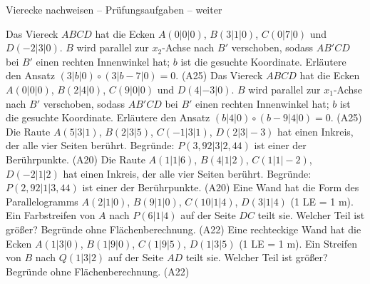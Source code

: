 \begin{aufgabe}{Vierecke nachweisen – Prüfungsaufgaben – weiter}
\begin{teile}
\teil Das Viereck $ABCD$ hat die Ecken $A(0 | 0 | 0)$, $B(3 | 1 | 0)$, $C(0 | 7 | 0)$ und $D(-2 | 3 | 0)$. $B$ wird parallel zur $x_2$-Achse nach $B'$ verschoben, sodass $AB'CD$ bei $B'$ einen rechten Innenwinkel hat; $b$ ist die gesuchte Koordinate. Erläutere den Ansatz $(3 | b | 0) \circ (3 | b - 7 | 0) = 0$. \hfill (A25)
\teil Das Viereck $ABCD$ hat die Ecken $A(0 | 0 | 0)$, $B(2 | 4 | 0)$, $C(9 | 0 | 0)$ und $D(4 | -3 | 0)$. $B$ wird parallel zur $x_1$-Achse nach $B'$ verschoben, sodass $AB'CD$ bei $B'$ einen rechten Innenwinkel hat; $b$ ist die gesuchte Koordinate. Erläutere den Ansatz $(b | 4 | 0) \circ (b - 9 | 4 | 0) = 0$. \hfill (A25)
\teil Die Raute $A(5 | 3 | 1)$, $B(2 | 3 | 5)$, $C(-1 | 3 | 1)$, $D(2 | 3 | -3)$ hat einen Inkreis, der alle vier Seiten berührt. Begründe: $P(3{,}92 | 3 | 2{,}44)$ ist einer der Berührpunkte. \hfill (A20)
\teil Die Raute $A(1 | 1 | 6)$, $B(4 | 1 | 2)$, $C(1 | 1 | -2)$, $D(-2 | 1 | 2)$ hat einen Inkreis, der alle vier Seiten berührt. Begründe: $P(2{,}92 | 1 | 3{,}44)$ ist einer der Berührpunkte. \hfill (A20)
\teil Eine Wand hat die Form des Parallelogramms $A(2 | 1 | 0)$, $B(9 | 1 | 0)$, $C(10 | 1 | 4)$, $D(3 | 1 | 4)$ (1 LE = 1 m). Ein Farbstreifen von $A$ nach $P(6 | 1 | 4)$ auf der Seite $DC$ teilt sie. Welcher Teil ist größer? Begründe ohne Flächenberechnung. \hfill (A22)
\teil Eine rechteckige Wand hat die Ecken $A(1 | 3 | 0)$, $B(1 | 9 | 0)$, $C(1 | 9 | 5)$, $D(1 | 3 | 5)$ (1 LE = 1 m). Ein Streifen von $B$ nach $Q(1 | 3 | 2)$ auf der Seite $AD$ teilt sie. Welcher Teil ist größer? Begründe ohne Flächenberechnung. \hfill (A22)
\end{teile}
\end{aufgabe}

\medskip
{}

